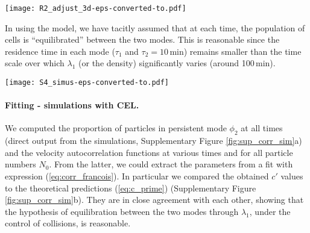 \documentclass[11pt, twocolumn]{article}
\newcommand\rev[1]{{#1}}
\newcommand{\Dru}{{D_{\mathrm{r1}}}}
\newcommand{\lamu}{\lambda_1}
\newcommand{\taud}{\tau_2}
\begin{document}
\begin{figure*}[ht!]
\centering
\texttt{[image: R2\_adjust\_3d-eps-converted-to.pdf]}

\caption{Parameter space for the fitting procedure.\\
  The average $R^2$ computed from 25 experimental curves of
  correlation functions exhibits a clear peak at \rev{
    $\Dru^{-1}=1.7\,$min and $\taud=8.6\,$min.  } Here, the
  time-windows for $t\geqslant200\,$min were not considered in order
  not to overweight the long-term behaviours. Using the complete set
  of 39 curves slightly moves the peak of $R^2$ but then
  $\Dru^{-1}=2\,$min and $\taud=10\,$min remain excellent estimates.}
\label{fig:sup_R2}
\end{figure*}


In using the model, we have tacitly assumed that at each time, the
population of cells is ``equilibrated'' between the two modes.  This
is reasonable since the residence time in each mode ($\tau_1$ and
$\tau_2=10\,$min) remains smaller than the time scale over which
$\lamu$ (or the density) significantly varies (around 100\,min).


\begin{figure*}[ht!]

\centering
\texttt{[image: S4\_simus-eps-converted-to.pdf]}

\caption{Simulations -- Results of the fitting of the velocity autocorrelation functions applied to simulations with CEL.\\
  (a) Proportion of cells in mode 2.  (b) Prefactor $c'$ of the
  longest relaxation in the correlation function. Theoretical
  prediction from $\phi_2$ (---) and measurement from the correlation
  functions (o).}
\label{fig:sup_corr_sim}
\end{figure*}


\paragraph{Fitting - simulations with CEL.}
%
We computed the proportion of particles in persistent mode $\phi_2$ at
all times (direct output from the simulations, Supplementary Figure
\ref{fig:sup_corr_sim}a) and the velocity autocorrelation functions at
various times and for all particle numbers $N_0$. From the latter, we
could extract the parameters from a fit with expression
(\ref{eq:corr_francois}).  In particular we compared the obtained $c'$
values to the theoretical predictions (\ref{eq:c_prime})
(Supplementary Figure \ref{fig:sup_corr_sim}b). They are in close
agreement with each other, showing that the hypothesis of
equilibration between the two modes through $\lambda_1$, under the
control of collisions, is reasonable.
\end{document}
